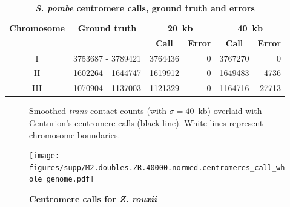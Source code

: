 \begin{table}[ht!]
\caption{\textbf{\textit{S. pombe} centromere calls, ground truth and errors}}
\begin{center}
\begin{tabular}{c | c  r  r  r  r}
\textbf{Chromosome}  & \textbf{Ground truth} & \multicolumn{2}{c}{\textbf{20~kb}} & \multicolumn{2}{c}{\textbf{40~kb}} \\
  &   &  \multicolumn{1}{c}{\textbf{Call}} &  \multicolumn{1}{c}{\textbf{Error}} &  \multicolumn{1}{c}{\textbf{Call}} &  \multicolumn{1}{c}{\textbf{Error}} \\
\hline
I & \num[group-separator={\,}]{3753687} - \num[group-separator={\,}]{3789421} & \num[group-separator={\,}]{3764436} & \small{\num[group-separator={\,}]{0}}  & \num[group-separator={\,}]{3767270} & \small{\num[group-separator={\,}]{0}}  \\
II & \num[group-separator={\,}]{1602264} - \num[group-separator={\,}]{1644747} & \num[group-separator={\,}]{1619912} & \small{\num[group-separator={\,}]{0}}  & \num[group-separator={\,}]{1649483} & \small{\num[group-separator={\,}]{4736}}  \\
III & \num[group-separator={\,}]{1070904} - \num[group-separator={\,}]{1137003} & \num[group-separator={\,}]{1121329} & \small{\num[group-separator={\,}]{0}}  & \num[group-separator={\,}]{1164716} & \small{\num[group-separator={\,}]{27713}}  \\
\end{tabular}
\end{center}
\end{table}

\clearpage



\begin{figure}[ht!]
\caption{\textbf{Centromere calls for \textit{Z. rouxii}}}{
Smoothed \textit{trans} contact counts (with $\sigma=40$~kb) overlaid with
Centurion's centromere calls (black line). White lines represent chromosome
boundaries.
}

\begin{center}
\texttt{[image: figures/supp/M2.doubles.ZR.40000.normed.centromeres\_call\_whole\_genome.pdf]}
\end{center}
\label{suppfig:ZR_calls}
\end{figure}

